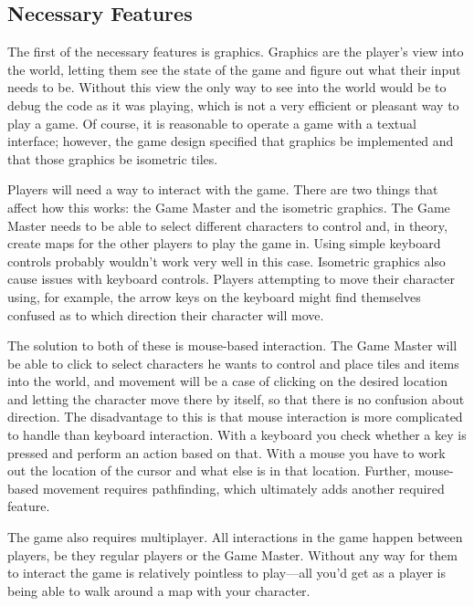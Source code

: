 \subsection{Necessary Features}
The first of the necessary features is graphics. Graphics are the player's view into the world, letting them see the state of the game and figure out what their input needs to be. Without this view the only way to see into the world would be to debug the code as it was playing, which is not a very efficient or pleasant way to play a game. Of course, it is reasonable to operate a game with a textual interface; however, the game design specified that graphics be implemented and that those graphics be isometric tiles.

Players will need a way to interact with the game. There are two things that affect how this works: the Game Master and the isometric graphics. The Game Master needs to be able to select different characters to control and, in theory, create maps for the other players to play the game in. Using simple keyboard controls probably wouldn't work very well in this case. Isometric graphics also cause issues with keyboard controls. Players attempting to move their character using, for example, the arrow keys on the keyboard might find themselves confused as to which direction their character will move.

The solution to both of these is mouse-based interaction. The Game Master will be able to click to select characters he wants to control and place tiles and items into the world, and movement will be a case of clicking on the desired location and letting the character move there by itself, so that there is no confusion about direction. The disadvantage to this is that mouse interaction is more complicated to handle than keyboard interaction. With a keyboard you check whether a key is pressed and perform an action based on that. With a mouse you have to work out the location of the cursor and what else is in that location. Further, mouse-based movement requires pathfinding, which ultimately adds another required feature.

The game also requires multiplayer. All interactions in the game happen between players, be they regular players or the Game Master. Without any way for them to interact the game is relatively pointless to play---all you'd get as a player is being able to walk around a map with your character.

